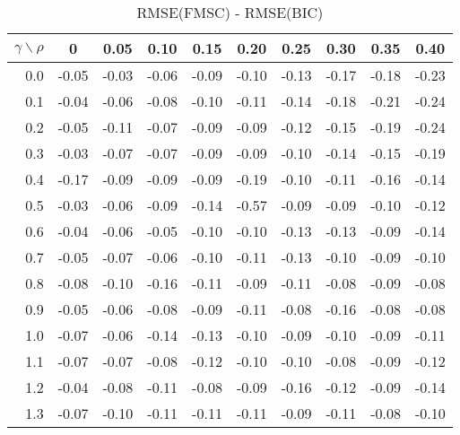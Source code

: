 \documentclass[12pt]{article}
\begin{document}
%
\begin{table}[!tbp]
\caption{RMSE(FMSC) - RMSE(BIC)}
 \begin{center}
 \begin{tabular}{r|rrrrrrrrr}\hline\hline
\multicolumn{1}{c|}{$\gamma\backslash\rho$}&\multicolumn{1}{c}{0}&\multicolumn{1}{c}{0.05}&\multicolumn{1}{c}{0.10}&\multicolumn{1}{c}{0.15}&\multicolumn{1}{c}{0.20}&\multicolumn{1}{c}{0.25}&\multicolumn{1}{c}{0.30}&\multicolumn{1}{c}{0.35}&\multicolumn{1}{c}{0.40}\tabularnewline
\hline

0.0&-0.05&-0.03&-0.06&-0.09&-0.10&-0.13&-0.17&-0.18&-0.23\tabularnewline
0.1&-0.04&-0.06&-0.08&-0.10&-0.11&-0.14&-0.18&-0.21&-0.24\tabularnewline
0.2&-0.05&-0.11&-0.07&-0.09&-0.09&-0.12&-0.15&-0.19&-0.24\tabularnewline
0.3&-0.03&-0.07&-0.07&-0.09&-0.09&-0.10&-0.14&-0.15&-0.19\tabularnewline
0.4&-0.17&-0.09&-0.09&-0.09&-0.19&-0.10&-0.11&-0.16&-0.14\tabularnewline
0.5&-0.03&-0.06&-0.09&-0.14&-0.57&-0.09&-0.09&-0.10&-0.12\tabularnewline
0.6&-0.04&-0.06&-0.05&-0.10&-0.10&-0.13&-0.13&-0.09&-0.14\tabularnewline
0.7&-0.05&-0.07&-0.06&-0.10&-0.11&-0.13&-0.10&-0.09&-0.10\tabularnewline
0.8&-0.08&-0.10&-0.16&-0.11&-0.09&-0.11&-0.08&-0.09&-0.08\tabularnewline
0.9&-0.05&-0.06&-0.08&-0.09&-0.11&-0.08&-0.16&-0.08&-0.08\tabularnewline
1.0&-0.07&-0.06&-0.14&-0.13&-0.10&-0.09&-0.10&-0.09&-0.11\tabularnewline
1.1&-0.07&-0.07&-0.08&-0.12&-0.10&-0.10&-0.08&-0.09&-0.12\tabularnewline
1.2&-0.04&-0.08&-0.11&-0.08&-0.09&-0.16&-0.12&-0.09&-0.14\tabularnewline
1.3&-0.07&-0.10&-0.11&-0.11&-0.11&-0.09&-0.11&-0.08&-0.10\tabularnewline
\hline
\end{tabular}

\end{center}

\end{table}
\end{document}
